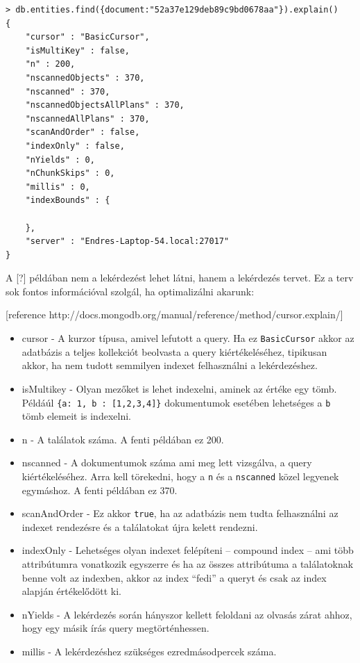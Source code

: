 \begin{lstlisting}[caption=Az diagram kollekció egy lekérdezésének a query terve]
> db.entities.find({document:"52a37e129deb89c9bd0678aa"}).explain()
{
    "cursor" : "BasicCursor",
    "isMultiKey" : false,
    "n" : 200,
    "nscannedObjects" : 370,
    "nscanned" : 370,
    "nscannedObjectsAllPlans" : 370,
    "nscannedAllPlans" : 370,
    "scanAndOrder" : false,
    "indexOnly" : false,
    "nYields" : 0,
    "nChunkSkips" : 0,
    "millis" : 0,
    "indexBounds" : {

    },
    "server" : "Endres-Laptop-54.local:27017"
}
\end{lstlisting}


A [?] példában nem a lekérdezést lehet látni, hanem a lekérdezés tervet. Ez a terv sok fontos információval szolgál, ha optimalizálni akarunk:

[reference http://docs.mongodb.org/manual/reference/method/cursor.explain/]

\begin{itemize}
                        
  \item{cursor} - A kurzor típusa, amivel lefutott a query. Ha ez \lstinline{BasicCursor} akkor az adatbázis a teljes kollekciót beolvasta a query kiértékeléséhez, tipikusan akkor, ha nem tudott semmilyen indexet felhasználni a lekérdezéshez.
  \item{isMultikey} -  Olyan mezőket is lehet indexelni, aminek az értéke egy tömb. Példáúl \lstinline|{a: 1, b : [1,2,3,4]}| dokumentumok esetében lehetséges a \lstinline{b} tömb elemeit is indexelni. 
  \item{n} - A találatok száma. A fenti példában ez 200.
  \item{nscanned} - A dokumentumok száma ami meg lett vizsgálva, a query kiértékeléséhez. Arra kell törekedni, hogy a \lstinline{n} és a \lstinline{nscanned} közel legyenek egymáshoz. A fenti példában ez 370.

   \item{scanAndOrder} - Ez akkor \lstinline{true}, ha az adatbázis nem tudta felhasználni az indexet rendezésre és a találatokat újra kelett rendezni.
   \item{indexOnly} - Lehetséges olyan indexet felépíteni -- compound index -- ami több attribútumra vonatkozik egyszerre és ha az összes attribútuma a találatoknak benne volt az indexben, akkor az index ``fedi'' a queryt és csak az index alapján értékelődött ki. 
   \item{nYields} - A lekérdezés során hányszor kellett feloldani az olvasás zárat ahhoz, hogy egy másik írás query megtörténhessen. 
   \item{millis} - A lekérdezéshez szükséges ezredmásodpercek száma.


\end{itemize}

